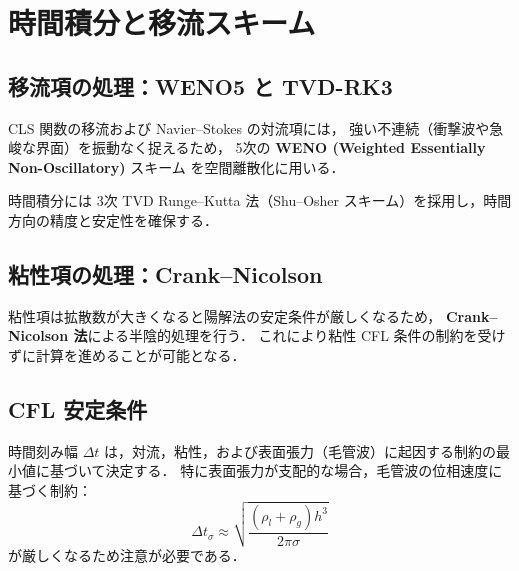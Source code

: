 \section{時間積分と移流スキーム}
\label{sec:time}

\subsection{移流項の処理：WENO5 と TVD-RK3}

CLS 関数の移流および Navier--Stokes の対流項には，
強い不連続（衝撃波や急峻な界面）を振動なく捉えるため，
5次の \textbf{WENO (Weighted Essentially Non-Oscillatory)} スキーム \cite{JiangShu1996} を空間離散化に用いる．

時間積分には 3次 TVD Runge--Kutta 法（Shu--Osher スキーム）を採用し，時間方向の精度と安定性を確保する．

\subsection{粘性項の処理：Crank--Nicolson}

粘性項は拡散数が大きくなると陽解法の安定条件が厳しくなるため，
\textbf{Crank--Nicolson 法}による半陰的処理を行う．
これにより粘性 CFL 条件の制約を受けずに計算を進めることが可能となる．

\subsection{CFL 安定条件}

時間刻み幅 $\Delta t$ は，対流，粘性，および表面張力（毛管波）に起因する制約の最小値に基づいて決定する．
特に表面張力が支配的な場合，毛管波の位相速度に基づく制約：
\begin{equation}
  \Delta t_\sigma \approx \sqrt{\frac{(\rho_l+\rho_g)h^3}{2\pi\sigma}}
\end{equation}
が厳しくなるため注意が必要である．
